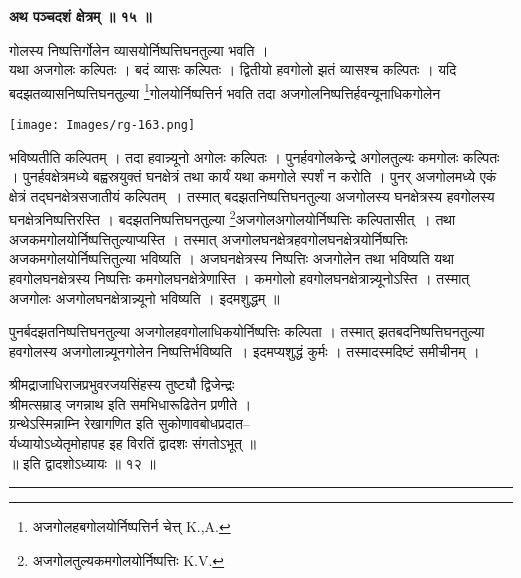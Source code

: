 \documentclass[11pt, openany]{book}
\begin{document}
\begin{center}
\textbf{\large अथ पञ्चदशं क्षेत्रम् ॥ १५ ॥}
\end{center}
\vspace{2mm}

{\ab गोलस्य निष्पत्तिर्गोलेन व्यासयोर्निष्पत्तिघनतुल्या भवति ।}\\

 यथा अजगोलः कल्पितः । बदं व्यासः कल्पितः । द्वितीयो हवगोलो झतं व्यासश्च कल्पितः । यदि बदझतव्यासनिष्पत्तिघनतुल्या \renewcommand{\thefootnote}{१}\footnote{अजगोलहबगोलयोर्निष्पत्तिर्न चेत्त् {\en K.,A.}}गोलयोर्निष्पत्तिर्न भवति तदा अजगोलनिष्पत्तिर्हवन्यूनाधिकगोलेन 
\begin{center} \texttt{[image: Images/rg-163.png]}  
\end{center}



\newpage
\noindent भविष्यतीति कल्पितम् । तदा हवान्न्यूनो अगोलः कल्पितः । पुनर्हवगोलकेन्द्रे अगोलतुल्यः कमगोलः कल्पितः । पुनर्हवक्षेत्रमध्ये बह्वस्रयुक्तं घनक्षेत्रं तथा कार्यं यथा कमगोले स्पर्शं न करोति । पुनर् अजगोलमध्ये एकं क्षेत्रं तद्घनक्षेत्रसजातीयं कल्पितम्~। तस्मात् बदझतनिष्पत्तिघनतुल्या अजगोलस्य घनक्षेत्रस्य हवगोलस्य घनक्षेत्रनिष्पत्तिरस्ति । बदझतनिष्पत्तिघनतुल्या \renewcommand{\thefootnote}{१}\footnote{अजगोलतुल्यकमगोलयोर्निष्पत्तिः {\en K.V.}}अजगोलअगोलयोर्निष्पत्तिः
कल्पितासीत्~। तथा अजकमगोलयोर्निष्पत्तितुल्याप्यस्ति । तस्मात् अजगोलघनक्षेत्रहवगोलघनक्षेत्रयोर्निष्पत्तिः अजकमगोलयोर्निष्पत्तितुल्या भविष्यति । अजघनक्षेत्रस्य निष्पत्तिः अजगोलेन तथा भविष्यति यथा हवगोलघनक्षेत्रस्य निष्पत्तिः कमगोलघनक्षेत्रेणास्ति । कमगोलो हवगोलघनक्षेत्रान्न्यूनोऽस्ति । तस्मात्
अजगोलः अजगोलघनक्षेत्रान्न्यूनो भविष्यति । इदमशुद्धम् ॥ \\
\vspace{5mm}

 पुनर्बदझतनिष्पत्तिघनतुल्या अजगोलहवगोलाधिकयोर्निष्पत्तिः कल्पिता । तस्मात् झतबदनिष्पत्तिघनतुल्या हवगोलस्य अजगोलान्न्यूनगोलेन निष्पत्तिर्भविष्यति~। इदमप्यशुद्धं कुर्मः । तस्मादस्मदिष्टं समीचीनम् । \\
 \begin{center}
{\small  श्रीमद्राजाधिराजप्रभुवरजयसिंहस्य तुष्ट्यौ द्विजेन्द्रः\\
श्रीमत्सम्राड् जगन्नाथ इति समभिधारूढितेन प्रणीते ।\\
ग्रन्थेऽस्मिन्नाम्नि रेखागणित इति सुकोणावबोधप्रदात--\\
र्यध्यायोऽध्येतृमोहापह इह विरतिं द्वादशः संगतोऽभूत् ॥\\
॥ इति द्वादशोऽध्यायः ॥ १२ ॥ }\\
\rule{0.7in}{0.3pt}

\end{center}
\end{document}

